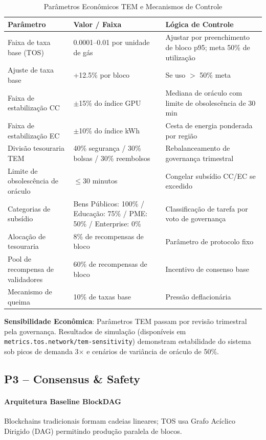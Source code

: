 \documentclass[11pt]{article}
\begin{document}
\begin{itemize}[noitemsep]
\begin{itemize}[noitemsep]
\begin{itemize}[noitemsep]
\begin{table}[H]
\centering
\caption{Parâmetros Econômicos TEM e Mecanismos de Controle}
\label{tab:tem-parameters}
\begin{tabular}{@{}p{}p{}p{}@{}}
\toprule
\textbf{Parâmetro} & \textbf{Valor / Faixa} & \textbf{Lógica de Controle} \\ \midrule
Faixa de taxa base (TOS) & 0.0001--0.01 por unidade de gás & Ajustar por preenchimento de bloco p95; meta 50\% de utilização \\
Ajuste de taxa base & +12.5\% por bloco & Se uso $>$ 50\% meta \\
Faixa de estabilização CC & $\pm$15\% do índice GPU & Mediana de oráculo com limite de obsolescência de 30 min \\
Faixa de estabilização EC & $\pm$10\% do índice kWh & Cesta de energia ponderada por região \\
Divisão tesouraria TEM & 40\% segurança / 30\% bolsas / 30\% reembolsos & Rebalanceamento de governança trimestral \\
Limite de obsolescência de oráculo & $\le$30 minutos & Congelar subsídio CC/EC se excedido \\
Categorias de subsídio & Bens Públicos: 100\% / Educação: 75\% / PME: 50\% / Enterprise: 0\% & Classificação de tarefa por voto de governança \\
Alocação de tesouraria & 8\% de recompensas de bloco & Parâmetro de protocolo fixo \\
Pool de recompensa de validadores & 60\% de recompensas de bloco & Incentivo de consenso base \\
Mecanismo de queima & 10\% de taxas base & Pressão deflacionária \\
\bottomrule
\end{tabular}
\end{table}

\textbf{Sensibilidade Econômica}: Parâmetros TEM passam por revisão trimestral pela governança. Resultados de simulação (disponíveis em \texttt{metrics.tos.network/tem-sensitivity}) demonstram estabilidade do sistema sob picos de demanda 3$\times$ e cenários de variância de oráculo de 50\%.

\subsection{P3 -- Consensus \& Safety}
\label{sec:pillar-consensus}

\paragraph{Arquitetura Baseline BlockDAG}
Blockchains tradicionais formam cadeias lineares; TOS usa Grafo Acíclico Dirigido (DAG) permitindo produção paralela de blocos.


\end{itemize}
\end{itemize}
\end{itemize}
\end{document}
